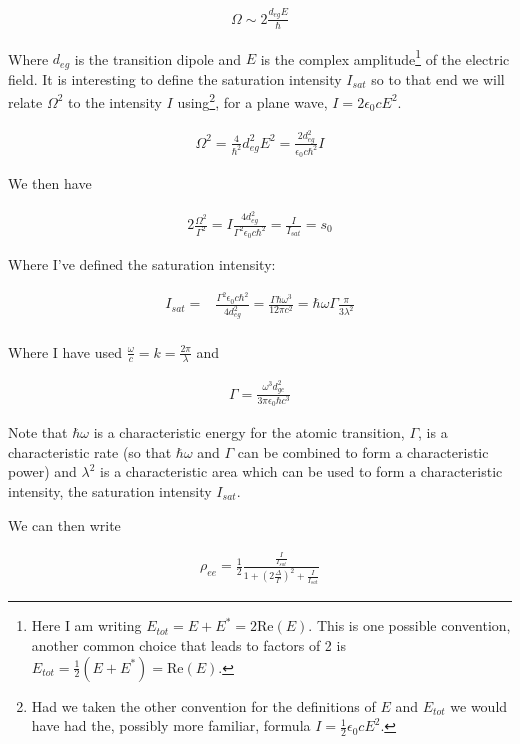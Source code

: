 \documentclass[12pt]{article}
\newcommand{\ep}{\epsilon}
\begin{document}
\begin{align}
\Omega \sim 2\frac{d_{eg} E}{\hbar}
\end{align}

Where $d_{eg}$ is the transition dipole and $E$ is the complex amplitude\footnote{Here I am writing $E_{tot} = E + E^* = 2\text{Re}(E)$. This is one possible convention, another common choice that leads to factors of 2 is $E_{tot} = \frac{1}{2}\left(E + E^*\right) = \text{Re}(E)$.} of the electric field.
It is interesting to define the saturation intensity $I_{sat}$ so to that end we will relate $\Omega^2$ to the intensity $I$ using\footnote{Had we taken the other convention for the definitions of $E$ and $E_{tot}$ we would have had the, possibly more familiar, formula $I = \frac{1}{2}\ep_0 c E^2$.}, for a plane wave, $I = 2\ep_0 c E^2$.

\begin{align}
\Omega^2 = \frac{4}{\hbar^2} d_{eg}^2 E^2 = \frac{2d_{eg}^2}{\ep_0 c \hbar^2} I
\end{align}

We then have

\begin{align}
2\frac{\Omega^2}{\Gamma^2} = I \frac{4 d_{eg}^2}{\Gamma^2 \ep_0 c \hbar^2} = \frac{I}{I_{sat}} = s_0
\end{align} 

Where I've defined the saturation intensity:

\begin{align}
I_{sat} =& \frac{\Gamma^2 \ep_0 c \hbar^2}{4d_{eg}^2} = \frac{\Gamma \hbar \omega^3}{12 \pi c^2} = \hbar \omega \Gamma \frac{\pi}{3\lambda^2}\\
\end{align}

Where I have used $\frac{\omega}{c} = k = \frac{2\pi}{\lambda}$ and

\begin{align}
\Gamma = \frac{\omega^3 d_{ge}^2}{3\pi \ep_0 \hbar c^3}
\end{align}

Note that $\hbar \omega$ is a characteristic energy for the atomic transition, $\Gamma$, is a characteristic rate (so that $\hbar \omega$ and $\Gamma$ can be combined to form a characteristic power) and $\lambda^2$ is a characteristic area which can be used to form a characteristic intensity, the saturation intensity $I_{sat}$.

We can then write

\begin{align}
\rho_{ee} = \frac{1}{2} \frac{\frac{I}{I_{sat}}}{1 + \left(2\frac{\Delta}{\Gamma}\right)^2 + \frac{I}{I_{sat}}}
\end{align}
\end{document}
